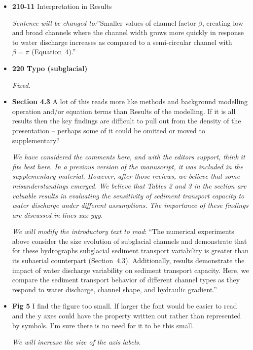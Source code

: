 \documentclass[11pt]{article}
\begin{document}
\begin{itemize}
\item \textbf{210-11} Interpretation in Results

  \textit{ Sentence will be changed to:}''Smaller values of channel factor $\beta$, creating low and broad channels where the channel width grows more quickly in response to water discharge increases as compared to a semi-circular channel with $\beta = \pi$ (Equation~4).''
  
\item \textbf{220 Typo (subglacial)}


  \textit{Fixed.}
  
\item \textbf{Section 4.3} A lot of this reads more like methods and background modelling operation
  and/or equation terms than Results of the modelling. If it is all results then
  the key findings are difficult to pull out from the density of the presentation
  – perhaps some of it could be omitted or moved to supplementary?

  \textit{We have considered the comments here, and with the editors support, think it fits best here.
    In a previous version of the manuscript, it was included in the supplementary material. However, after those reviews, we believe that some misunderstandings emerged. We believe that Tables 2 and 3 in the section are valuable results in evaluating the sensitivity of sediment transport capacity to water discharge under different assumptions.
    The importance of these findings are discussed in lines xxx yyy.
  }

  \textit{We will modify the introductory text to read}: ``The numerical experiments above consider the size evolution of subglacial channels and demonstrate that for these hydrographs subglacial sediment transport variability is greater than its subaerial counterpart (Section~4.3). 
Additionally, results demonstrate the impact of water discharge variability on sediment transport capacity.
Here, we compare the sediment transport behavior of different channel types as they respond to water discharge, channel shape, and hydraulic gradient.''


\item \textbf{Fig 5} I find the figure too small. If larger the font would be easier to read and the
  y axes could have the property written out rather than represented by
  symbols. I’m sure there is no need for it to be this small.

  \textit{We will increase the size of the axis labels.}


\end{itemize}
\end{document}
